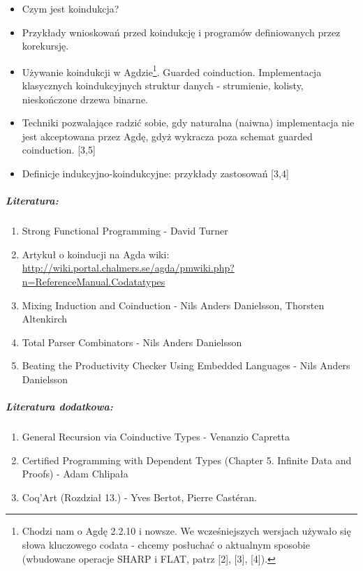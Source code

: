 \documentclass[10pt, a4paper]{article}
\begin{document}
\begin{itemize}
\addtolength{\itemsep}{-0.5\baselineskip}

 \item Czym jest koindukcja?
 \item Przykłady wnioskowań przed koindukcję i programów definiowanych przez korekursję.
 \item Używanie koindukcji w Agdzie\footnote{
Chodzi nam o Agdę 2.2.10 i nowsze. We wcześniejszych wersjach używało się słowa kluczowego codata - chcemy posłuchać o aktualnym sposobie (wbudowane operacje SHARP i FLAT, patrz [2], [3], [4]).
}. Guarded coinduction. Implementacja klasycznych koindukcyjnych struktur danych - strumienie, kolisty, nieskończone drzewa binarne.
 \item Techniki pozwalające radzić sobie, gdy naturalna (naiwna) implementacja nie jest akceptowana przez Agdę, gdyż wykracza poza schemat guarded coinduction. [3,5]
 \item Definicje indukcyjno-koindukcyjne: przykłady zastosowań [3,4]
\end{itemize}

\subparagraph{Literatura:}

\begin{enumerate}
\addtolength{\itemsep}{-0.5\baselineskip}
 \item Strong Functional Programming - David Turner
 \item Artykuł o koinducji na Agda wiki: \\ {\small
       \url{http://wiki.portal.chalmers.se/agda/pmwiki.php?n=ReferenceManual.Codatatypes}
      }
 \item Mixing Induction and Coinduction - Nils Anders Danielsson, Thorsten Altenkirch
 \item Total Parser Combinators - Nils Anders Danielsson
 \item Beating the Productivity Checker Using Embedded Languages - Nils Anders Danielsson
\end{enumerate}

\subparagraph{Literatura dodatkowa:}

\begin{enumerate}
\addtolength{\itemsep}{-0.5\baselineskip}
 \item General Recursion via Coinductive Types - Venanzio Capretta
 \item Certified Programming with Dependent Types (Chapter 5. Infinite Data and Proofs) - Adam Chlipała
 \item Coq’Art (Rozdział 13.) - Yves Bertot, Pierre Castéran.
\end{enumerate}
\end{document}

